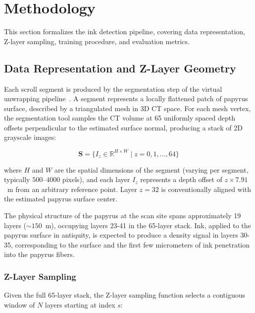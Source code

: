 \section{Methodology}
\label{sec:methodology}

This section formalizes the ink detection pipeline, covering data representation, Z-layer sampling, training procedure, and evaluation metrics.

\subsection{Data Representation and Z-Layer Geometry}
\label{sec:data_representation}

Each scroll segment is produced by the segmentation step of the virtual unwrapping pipeline~\cite{seales2023educelab}. A segment represents a locally flattened patch of papyrus surface, described by a triangulated mesh in 3D CT space. For each mesh vertex, the segmentation tool samples the CT volume at 65 uniformly spaced depth offsets perpendicular to the estimated surface normal, producing a stack of 2D grayscale images:

\begin{equation}
\label{eq:zlayer_stack}
\mathbf{S} = \{I_z \in \mathbb{R}^{H \times W} \mid z = 0, 1, \ldots, 64\}
\end{equation}

\noindent where $H$ and $W$ are the spatial dimensions of the segment (varying per segment, typically $500$--$4000$ pixels), and each layer $I_z$ represents a depth offset of $z \times 7.91$~\textmu m from an arbitrary reference point. Layer $z = 32$ is conventionally aligned with the estimated papyrus surface center.

The physical structure of the papyrus at the scan site spans approximately 19 layers (${\sim}150$~\textmu m), occupying layers 23-41 in the 65-layer stack. Ink, applied to the papyrus surface in antiquity, is expected to produce a density signal in layers 30-35, corresponding to the surface and the first few micrometers of ink penetration into the papyrus fibers.

\subsubsection{Z-Layer Sampling}

Given the full 65-layer stack, the Z-layer sampling function selects a contiguous window of $N$ layers starting at index $s$:

